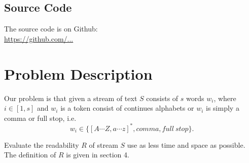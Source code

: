 \documentclass{article}
\begin{document}
\subsection{Source Code}
The source code is on Github:\\\url{https://github.com/...}


 
\section{Problem Description}
Our problem is that given a stream of text $S$ consists of $s$ words $w_i$, where $i\in[1,s]$ and $w_i$ is a token consist of continues alphabets or $w_i$ is simply a comma or full stop,
i.e.
\[w_i \in \{[A \cdots Z, a \cdots z]^*, comma, full\ stop\}.\]

Evaluate the readability $R$ of stream $S$ use as less time and space as possible. The definition of $R$ is given in section 4.
\end{document}
